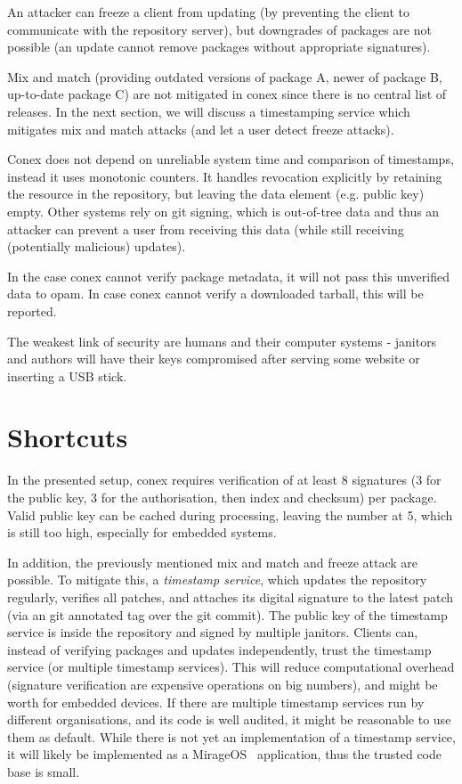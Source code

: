 \documentclass[nocopyrightspace]{sigplanconf}
\begin{document}
An attacker can freeze a client from updating (by preventing the client to communicate with the repository server), but downgrades of packages are not possible (an update cannot remove packages without appropriate signatures).

Mix and match (providing outdated versions of package A, newer of package B, up-to-date package C) are not mitigated in conex since there is no central list of releases.
In the next section, we will discuss a timestamping service which mitigates mix and match attacks (and let a user detect freeze attacks).

Conex does not depend on unreliable system time and comparison of timestamps, instead it uses monotonic counters.
It handles revocation explicitly by retaining the resource in the repository, but leaving the data element (e.g. public key) empty.
Other systems rely on git signing, which is out-of-tree data and thus an attacker can prevent a user from receiving this data (while still receiving (potentially malicious) updates).

In the case conex cannot verify package metadata, it will not pass this unverified data to opam.
In case conex cannot verify a downloaded tarball, this will be reported.

The weakest link of security are humans and their computer systems - janitors and authors will have their keys compromised after serving some website or inserting a USB stick.

\section{Shortcuts} \label{sec:shortcuts}
In the presented setup, conex requires verification of at least 8 signatures (3 for the public key, 3 for the authorisation, then index and checksum) per package.
Valid public key can be cached during processing, leaving the number at 5, which is still too high, especially for embedded systems.

In addition, the previously mentioned mix and match and freeze attack are possible.
To mitigate this, a \emph{timestamp service}, which updates the repository regularly, verifies all patches, and attaches its digital signature to the latest patch (via an git annotated tag over the git commit).
The public key of the timestamp service is inside the repository and signed by multiple janitors.
Clients can, instead of verifying packages and updates independently, trust the timestamp service (or multiple timestamp services).
This will reduce computational overhead (signature verification are expensive operations on big numbers), and might be worth for embedded devices.
If there are multiple timestamp services run by different organisations, and its code is well audited, it might be reasonable to use them as default.
While there is not yet an implementation of a timestamp service, it will likely be implemented as a MirageOS~\cite{mirage} application, thus the trusted code base is small.
\end{document}
